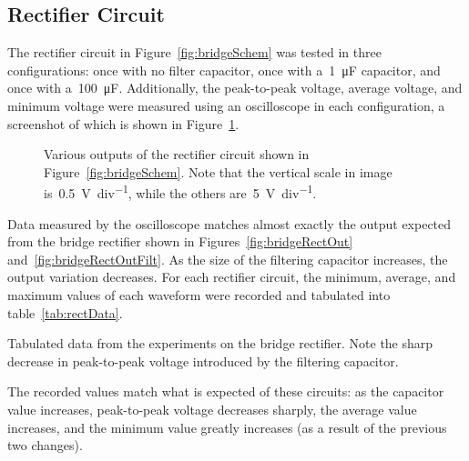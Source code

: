 \subsection{Rectifier Circuit}
The rectifier circuit in Figure~\ref{fig:bridgeSchem} was tested in three
configurations: once with no filter capacitor, once with a~\SI{1}{\micro\farad}
capacitor, and once with a~\SI{100}{\micro\farad}.  Additionally, the
peak-to-peak voltage, average voltage, and minimum voltage were measured using
an oscilloscope in each configuration, a screenshot of which is shown in
Figure~\ref{fig:rectShots}.
%
\begin{figure}[H]
	\centering
	\quad
	\quad

	\parbox{.9\textwidth}{
	\caption[Oscilloscope Screenshot --- Rectifier Circuit]{Various outputs of
	the rectifier circuit shown in Figure~\ref{fig:bridgeSchem}.  Note that the
	vertical scale in image~ is~\SI{.5}{\volt\per
	div}, while the others are~\SI{5}{\volt\per div}.}
	\label{fig:rectShots}}
\end{figure}
%
Data measured by the oscilloscope matches almost exactly the output expected
from the bridge rectifier shown in Figures~\ref{fig:bridgeRectOut}
and~\ref{fig:bridgeRectOutFilt}.  As the size of the filtering capacitor
increases, the output variation decreases.  For each rectifier circuit, the minimum, average, and maximum
values of each waveform were recorded and tabulated into
table~\ref{tab:rectData}.
%
\begin{table}[H]
	\centering
	
	\parbox{.6\textwidth}{
	\caption[Rectifier data]{Tabulated data from the experiments on the bridge
	rectifier.  Note the sharp decrease in peak-to-peak voltage introduced by
	the filtering capacitor.}
	\label{tab:rectData}
	}
\end{table}
%
The recorded values match what is expected of these circuits: as the capacitor
value increases, peak-to-peak voltage decreases sharply, the average value
increases, and the minimum value greatly increases (as a result of the previous
two changes).


